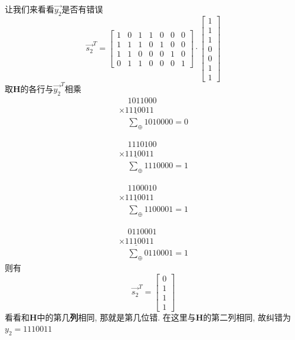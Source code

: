\documentclass[a4paper]{report}
\begin{document}
让我们来看看$\vec{y_2}$是否有错误
\[
  \vec{s_2}^T=
      \begin{bmatrix}
    1&0&1&1&0&0&0\\
    1&1&1&0&1&0&0\\
    1&1&0&0&0&1&0\\
    0&1&1&0&0&0&1
  \end{bmatrix}\cdot 
    \begin{bmatrix}
    1\\1\\1\\0\\0\\1\\1
  \end{bmatrix}
\]
取$\textbf{H}$的各行与$\vec{y_2}^T$相乘
\begin{equation*}\begin{array}{c}
\phantom{\times}1011000\\
\underline{\times1110011}\\
\phantom\times \sum_{\oplus} 1010000=0
\end{array}\end{equation*}

\begin{equation*}\begin{array}{c}
\phantom{\times}1110100\\
\underline{\times1110011}\\
\phantom\times \sum_{\oplus} 1110000=1
\end{array}\end{equation*}

\begin{equation*}\begin{array}{c}
\phantom{\times}1100010\\
\underline{\times1110011}\\
\phantom\times \sum_{\oplus} 1100001=1
\end{array}\end{equation*}

\begin{equation*}\begin{array}{c}
\phantom{\times}0110001\\
\underline{\times1110011}\\
\phantom\times \sum_{\oplus} 0110001=1
\end{array}\end{equation*}
则有
\[
  \vec{s_2}^T=
  \begin{bmatrix}
    0\\1\\1\\1
  \end{bmatrix}
  \]
看看和$\textbf{H}$中的第几\textbf{列}相同, 那就是第几位错. 在这里与$\textbf{H}$的第二列相同, 故纠错为$y_2=1110011$
\end{document}
